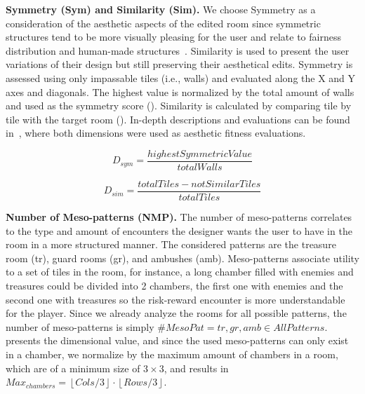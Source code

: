 \textbf{Symmetry (Sym) and Similarity (Sim).} We choose Symmetry as a consideration of the aesthetic aspects of the edited room since symmetric structures tend to be more visually pleasing for the user and relate to fairness distribution and human-made structures~. Similarity is used to present the user variations of their design but still preserving their aesthetical edits. Symmetry is assessed using only impassable tiles (i.e., walls) and evaluated along the X and Y axes and diagonals. The highest value is normalized by the total amount of walls and used as the symmetry score (). Similarity is calculated by comparing tile by tile with the target room (). In-depth descriptions and evaluations can be found in~, where both dimensions were used as aesthetic fitness evaluations.



\begin{equation} \label{eq:Symmetry}
D_{sym} = \frac{highestSymmetricValue} {totalWalls}
\end{equation}

\begin{equation} \label{eq:similarity}
D_{sim} = \frac{totalTiles - notSimilarTiles} {totalTiles}
\end{equation}

\textbf{Number of Meso-patterns (NMP).} The number of meso-patterns correlates to the type and amount of encounters the designer wants the user to have in the room in a more structured manner. The considered patterns are the treasure room (tr), guard rooms (gr), and ambushes (amb). Meso-patterns associate utility to a set of tiles in the room, for instance, a long chamber filled with enemies and treasures could be divided into 2 chambers, the first one with enemies and the second one with treasures so the risk-reward encounter is more understandable for the player. Since we already analyze the rooms for all possible patterns, the number of meso-patterns is simply $\#MesoPat=tr, gr, amb \in AllPatterns$.  presents the dimensional value, and since the used meso-patterns can only exist in a chamber, we normalize by the maximum amount of chambers in a room, which are of a minimum size of $3\times3$, and results in $Max_{chambers}=\left\lfloor Cols/3 \right\rfloor \cdot \left\lfloor Rows/3 \right\rfloor$.

